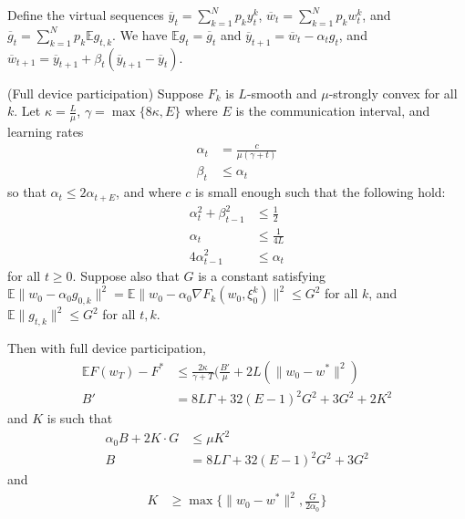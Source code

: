 Define the virtual sequences $\overline{y}_{t}=\sum_{k=1}^{N}p_{k}y_{t}^{k}$,
$\overline{w}_{t}=\sum_{k=1}^{N}p_{k}w_{t}^{k}$, and $\overline{g}_{t}=\sum_{k=1}^{N}p_{k}\mathbb{E}g_{t,k}$.
We have $\mathbb{E}g_{t}=\overline{g}_{t}$ and $\overline{y}_{t+1}=\overline{w}_{t}-\alpha_{t}g_{t}$,
and $\overline{w}_{t+1}=\overline{y}_{t+1}+\beta_{t}(\overline{y}_{t+1}-\overline{y}_{t})$. 
\begin{theorem}
	(Full device participation) Suppose $F_{k}$ is $L$-smooth and $\mu$-strongly
	convex for all $k$. Let $\kappa=\frac{L}{\mu}$, $\gamma=\max\{8\kappa,E\}$
	where $E$ is the communication interval, and learning rates 
	\begin{align*}
	\alpha_{t} & =\frac{c}{\mu(\gamma+t)}\\
	\beta_{t} & \leq\alpha_{t}
	\end{align*}
	so that $\alpha_{t}\leq2\alpha_{t+E}$, and where $c$ is small enough
	such that the following hold: 
	\begin{align*}
	\alpha_{t}^{2}+\beta_{t-1}^{2} & \leq\frac{1}{2}\\
	\alpha_{t} & \leq\frac{1}{4L}\\
	4\alpha_{t-1}^{2} & \leq\alpha_{t}
	\end{align*}
	for all $t\geq0$. Suppose also that $G$ is a constant satisfying
	$\mathbb{E}\|w_{0}-\alpha_{0}g_{0,k}\|^{2}=\mathbb{E}\|w_{0}-\alpha_{0}\nabla F_{k}(w_{0},\xi_{0}^{k})\|^{2}\leq G^{2}$
	for all $k$, and $\mathbb{E}\|g_{t,k}\|^{2}\leq G^{2}$ for all $t,k$. 
	
	Then with full device participation, 
	\begin{align*}
	\mathbb{E}F(w_{T})-F^{\ast} & \leq\frac{2\kappa}{\gamma+T}(\frac{B'}{\mu}+2L(\|w_{0}-w^{\ast}\|^{2})\\
	B' & =8L\Gamma+32(E-1)^{2}G^{2}+3G^{2}+2K^{2}
	\end{align*}
	and $K$ is such that 
	\begin{align*}
	\alpha_{0}B+2K\cdot G & \leq\mu K^{2}\\
	B & =8L\Gamma+32(E-1)^{2}G^{2}+3G^{2}
	\end{align*}
	and
	\begin{align*}
	K & \geq\max\{\|w_{0}-w^{\ast}\|^{2},\frac{G}{2\alpha_{0}}\}
	\end{align*}
\end{theorem}
